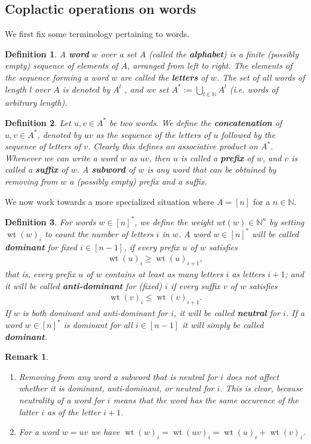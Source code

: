 \documentclass{article}
\newtheorem{defn}{Definition}
\newtheorem{rem}{Remark}
\DeclareMathOperator{\wt}{wt}
\begin{document}
\subsection{Coplactic operations on words}
We first fix some terminology pertaining to words.
\begin{defn} A \textbf{word} $w$ over a set $A$ (called the \textbf{alphabet}) is a finite \textit{(possibly empty)} sequence of elements of $A$, arranged from left to right. The elements of the sequence forming a word $w$ are called the \textbf{letters} of $w$. The set of all words of length $l$ over $A$ is denoted by $A^{l}$ , and we set $A^{*}:=\bigcup_{l\in \mathbb{N}}A^{l}$ (i.e. words of arbitrary length).
\end{defn}
\begin{defn}
Let $u,v \in A^*$ be two words. We define the \textbf{concatenation} of $u,v \in A^*$, denoted by $uv$ as the sequence of the letters of $u$ followed by the sequence of letters of $v$.  Clearly this defines an associative product on $A^*$. Whenever we can write a word $w$ as $uv$, then $u$ is called a \textbf{prefix} of $w$, and $v$ is called a \textbf{suffix} of $w$. A \textbf{subword} of $w$ is any word that can be obtained by removing from $w$ a (possibly empty) prefix and a suffix. 
\end{defn}
We now work towards a more specialized situation where $A=[n]$ for a $n \in \mathbb{N}$.
\begin{defn}
For words $w \in [n]^*$, we define the weight $wt(w) \in \mathbb{N}^n$ by setting $\wt(w)_i$ to count the number of letters $i$ in $w$. A word $w \in [n]^*$ will be called \textbf{dominant} for fixed $i \in [n-1]$, if every prefix $u$ of $w$ satisfies 
\begin{align}
    \wt(u)_i \geq \wt(u)_{i+1},
\end{align}
that is, every prefix $u$ of $w$ contains at least as many letters $i$ as letters $i+ 1$;
and it will be called \textbf{anti-dominant} for (fixed) $i$ if every suffix $v$ of $w$ satisfies \begin{align}
     \wt(v)_i \leq \wt(v)_{i+1}. 
\end{align}
If $w$ is both dominant and anti-dominant for $i$, it will be called \textbf{neutral} for $i$. If a word $w \in [n]^*$ is  dominant for all $i \in [n-1]$ it will simply be called \textbf{dominant}.
\end{defn}
\begin{rem} \ \begin{enumerate}
    \item Removing from any word a subword that is neutral for $i$ does not affect whether it is dominant, anti-dominant,  or neutral for $i$. This is clear, because neutrality of a word for $i$ means that the word has the same occurence of the latter $i$ as of the letter $i+1$. 
    \item For a word $w=uv$ we have $\wt(w)_i=\wt(uv)_i=\wt(u)_i + \wt(v)_i$.
\end{enumerate}

\end{rem}
\end{document}
